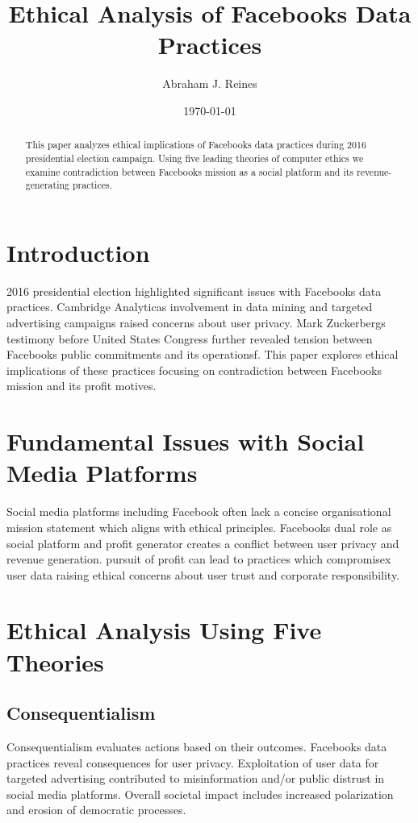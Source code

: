 \documentclass[12pt]{article}
\title{Ethical Analysis of Facebooks Data Practices}
\author{Abraham J. Reines}
\date{\today}
\begin{document}
\maketitle

\begin{abstract}
This paper analyzes ethical implications of Facebooks data practices during 2016 presidential election campaign. Using five leading theories of computer ethics we examine contradiction between Facebooks mission as a social platform and its revenue-generating practices.
\end{abstract}

\section{Introduction}
2016 presidential election highlighted significant issues with Facebooks data practices. Cambridge Analyticas involvement in data mining and targeted advertising campaigns raised concerns about user privacy. Mark Zuckerbergs testimony before United States Congress further revealed tension between Facebooks public commitments and its operationsf. This paper explores ethical implications of these practices focusing on contradiction between Facebooks mission and its profit motives.

\section{Fundamental Issues with Social Media Platforms}
Social media platforms including Facebook often lack a concise organisational mission statement which aligns with ethical principles. Facebooks dual role as social platform and profit generator creates a conflict between user privacy and revenue generation. pursuit of profit can lead to practices which compromisex user data raising ethical concerns about user trust and corporate responsibility.

\section{Ethical Analysis Using Five Theories}
\subsection{Consequentialism}
Consequentialism evaluates actions based on their outcomes. Facebooks data practices reveal consequences for user privacy. Exploitation of user data for targeted advertising contributed to misinformation and/or public distrust in social media platforms. Overall societal impact includes increased polarization and erosion of democratic processes.
\end{document}

